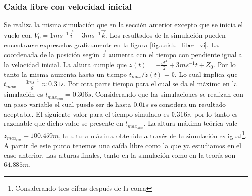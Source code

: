 \documentclass[main]{subfiles}
\begin{document}
\subsubsection{Ca\'ida libre con velocidad inicial}
Se realiza la misma simulaci\'on que en la secci\'on anterior excepto que se inicia el vuelo con $V_0 = 1ms^{-1}\vec{i}+3ms^{-1}\vec{k}$. Los resultados de la simulaci\'on pueden encontrarse expresados graficamente en la figura \ref{fig:caida_libre_vi}. La coordenada de la posici\'on seg\'un $\vec{i}$ aumenta con el tiempo con pendiente igual a la velocidad inicial. La altura cumple que $z(t)=-\frac{gt^2}{2}+3ms^{-1}t+Z_0$. Por lo tanto la misma aumenta hasta un tiempo  $t_{max} / \dot{z}(t)=0$. Lo cual implica que $t_{max}=\frac{3ms^{-1}}{g}\approx0.31s$. Por otra parte tiempo para el cual se da el m\'aximo en la simulaci\'on es $t_{max_{sim}} = 0.306s$. Considerando que las simulaciones se realizan con un paso variable el cual puede ser de hasta $0.01s$ se considera un resultado aceptable. El siguiente valor para el tiempo simulado es $0.316s$, por lo tanto es razonable que dicho valor se presente en $t_{max_{sim}}$. La altura m\'axima te\'orica vale $z_{max_{teo}}=100.459m$, la altura m\'axima obtenida a trav\'es de la simulaci\'on es igual\footnote{Considerando tres cifras despu\'es de la coma}. A partir de este punto tenemos una ca\'ida libre como la que ya estudiamos en el caso anterior. Las alturas finales, tanto en la simulaci\'on como en la teor\'ia son $64.885m$.
\end{document}
